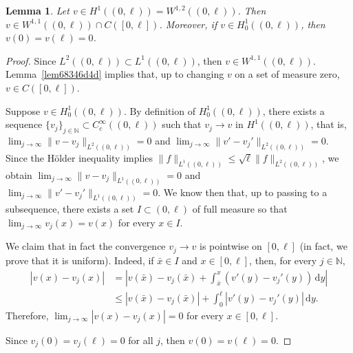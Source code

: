 \documentclass[a4paper,9pt]{amsart}
\newcommand{\N}{\mathbb{N}}	%
\newcommand{\did}{\,\mathrm{d}}	%
\theoremstyle{plain}
\newtheorem{lemma}[proposition]{Lemma}
\theoremstyle{definition}
\theoremstyle{remark}
\begin{document}
\begin{lemma}\label{lem68342e8e}
	Let $v\in H^1((0,\ell)) = W^{1,2}((0,\ell))$.
	Then $v\in W^{1,1}((0,\ell))\cap C([0,\ell])$.
	Moreover, if $v\in H^1_0((0,\ell))$, then $v(0)=v(\ell)=0$.
\end{lemma}
\begin{proof}
	Since $L^2((0,\ell))\subset L^1((0,\ell))$, then $v\in W^{1,1}((0,\ell))$.
	Lemma~\ref{lem68346d4d} implies that, up to changing $v$ on a set of measure zero, $v\in C([0,\ell])$.
	
	Suppose $v\in H^1_0((0,\ell))$.
	By definition of $H^1_0((0,\ell))$, there exists a sequence $\{v_j\}_{j\in\N}\subset C^\infty_c((0,\ell))$
	such that $v_j\to v$ in $H^1((0,\ell))$,
	that is, $\lim_{j\to\infty} \|v-v_j\|_{L^2((0,\ell))} = 0$ and $\lim_{j\to\infty} \|v'-v_j'\|_{L^2((0,\ell))} = 0$.
	Since the Hölder inequality implies $\|f\|_{L^1((0,\ell))} \le \sqrt{\ell} \|f\|_{L^2((0,\ell))}$,
	we obtain $\lim_{j\to\infty} \|v-v_j\|_{L^1((0,\ell))} = 0$ and $\lim_{j\to\infty} \|v'-v_j'\|_{L^1((0,\ell))} = 0$.
	We know then that, up to passing to a subsequence, there exists a set $I\subset(0,\ell)$ of full measure so that $\lim_{j\to\infty} v_j(x) = v(x)$ for every $x\in I$.
	

	We claim that in fact the convergence $v_j\to v$ is pointwise on $[0,\ell]$ (in fact, we prove that it is uniform).
	Indeed, if $\bar x\in I$ and $x\in[0,\ell]$, then, for every $j\in\N$,
	\begin{align}
		|v(x) - v_j(x)|
		&= \left| v(\bar x) - v_j(\bar x) + \int_{\bar x}^x (v'(y)-v_j'(y)) \did y \right| \\
		&\le |v(\bar x) - v_j(\bar x)| + \int_0^\ell |v'(y)-v_j'(y)| \did y .
	\end{align}
	Therefore, $\lim_{j\to\infty} |v(x) - v_j(x)| = 0$ for every $x\in[0,\ell]$.
	
	Since $v_j(0)=v_j(\ell)=0$ for all $j$, then $v(0)=v(\ell)=0$.
\end{proof}
\end{document}
